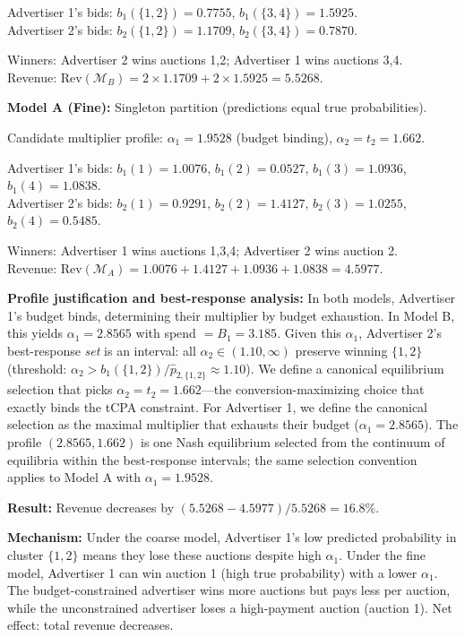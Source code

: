 \documentclass{article}
\theoremstyle{plain}
\theoremstyle{definition}
\theoremstyle{remark}
\newcommand{\cM}{\mathcal{M}}
\begin{document}
Advertiser 1's bids: $b_1(\{1,2\}) = 0.7755$, $b_1(\{3,4\}) = 1.5925$.\\
Advertiser 2's bids: $b_2(\{1,2\}) = 1.1709$, $b_2(\{3,4\}) = 0.7870$.

Winners: Advertiser 2 wins auctions 1,2; Advertiser 1 wins auctions 3,4.\\
Revenue: $\text{Rev}(\cM_B) = 2 \times 1.1709 + 2 \times 1.5925 = 5.5268$.

\textbf{Model A (Fine):} Singleton partition (predictions equal true probabilities).

Candidate multiplier profile: $\alpha_1 = 1.9528$ (budget binding), $\alpha_2 = t_2 = 1.662$.

Advertiser 1's bids: $b_1(1) = 1.0076$, $b_1(2) = 0.0527$, $b_1(3) = 1.0936$, $b_1(4) = 1.0838$.\\
Advertiser 2's bids: $b_2(1) = 0.9291$, $b_2(2) = 1.4127$, $b_2(3) = 1.0255$, $b_2(4) = 0.5485$.

Winners: Advertiser 1 wins auctions 1,3,4; Advertiser 2 wins auction 2.\\
Revenue: $\text{Rev}(\cM_A) = 1.0076 + 1.4127 + 1.0936 + 1.0838 = 4.5977$.

\textbf{Profile justification and best-response analysis:} In both models, Advertiser 1's budget binds, determining their multiplier by budget exhaustion. In Model B, this yields $\alpha_1 = 2.8565$ with spend $= B_1 = 3.185$. Given this $\alpha_1$, Advertiser 2's best-response \emph{set} is an interval: all $\alpha_2 \in (1.10, \infty)$ preserve winning $\{1,2\}$ (threshold: $\alpha_2 > b_1(\{1,2\})/\hat{p}_{2,\{1,2\}} \approx 1.10$). We define a canonical equilibrium selection that picks $\alpha_2 = t_2 = 1.662$---the conversion-maximizing choice that exactly binds the tCPA constraint. For Advertiser 1, we define the canonical selection as the maximal multiplier that exhausts their budget ($\alpha_1 = 2.8565$). The profile $(2.8565, 1.662)$ is one Nash equilibrium selected from the continuum of equilibria within the best-response intervals; the same selection convention applies to Model A with $\alpha_1 = 1.9528$.

\textbf{Result:} Revenue decreases by $(5.5268 - 4.5977)/5.5268 = 16.8\%$.

\textbf{Mechanism:} Under the coarse model, Advertiser 1's low predicted probability in cluster $\{1,2\}$ means they lose these auctions despite high $\alpha_1$. Under the fine model, Advertiser 1 can win auction 1 (high true probability) with a lower $\alpha_1$. The budget-constrained advertiser wins more auctions but pays less per auction, while the unconstrained advertiser loses a high-payment auction (auction 1). Net effect: total revenue decreases.
\end{document}
